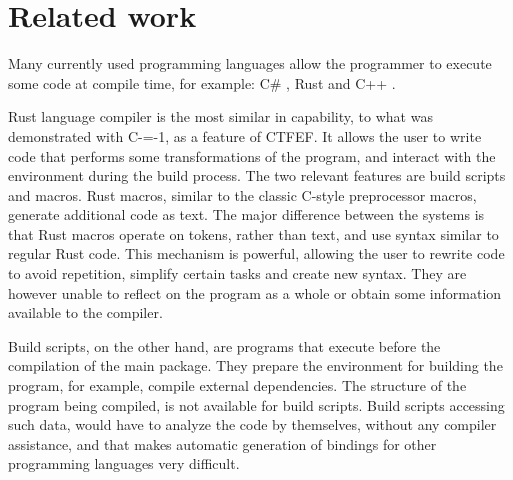 \section{Related work}
\label{related-work}

Many currently used programming languages allow the programmer to execute some code at compile time, for example: C\# \cite{csharp:source_generators,roslyn}, Rust \cite{rust, klabnik2019rust} and C++ \cite{ISO:cpp20}.

Rust language compiler is the most similar in capability, to what was demonstrated with C-=-1, as a feature of CTFEF.
It allows the user to write code that performs some transformations of the program, and interact with the environment during the build process.
The two relevant features are build scripts and macros.
Rust macros, similar to the classic C-style preprocessor macros, generate additional code as text.
The major difference between the systems is that Rust macros operate on tokens, rather than text, and use syntax similar to regular Rust code.
This mechanism is powerful, allowing the user to rewrite code to avoid repetition, simplify certain tasks and create new syntax.
They are however unable to reflect on the program as a whole or obtain some information available to the compiler.

Build scripts, on the other hand, are programs that execute before the compilation of the main package.
They prepare the environment for building the program, for example, compile external dependencies.
The structure of the program being compiled, is not available for build scripts.
Build scripts accessing such data, would have to analyze the code by themselves, without any compiler assistance, and that makes automatic generation of bindings for other programming languages very difficult.
